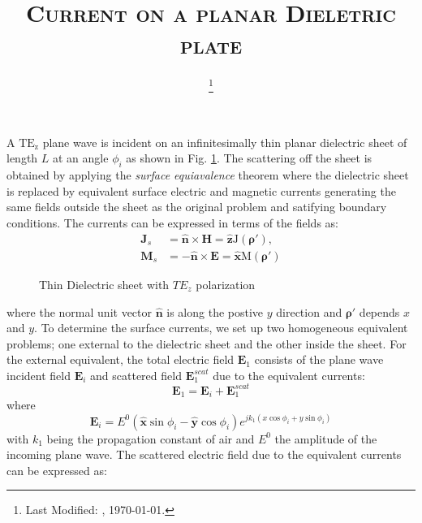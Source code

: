 \documentclass[11pt]{article}
\renewcommand{\v}[1]{\mathbf{#1}} %
\newcommand{\p}{\rho}  %
\newcommand{\x}{\times}  %
\renewcommand{\^}{\hat}  %
\begin{document}
\title{\textsc{Current on a planar Dieletric plate}\\}
\date{\footnote{Last Modified: \currenttime, \today.}}
\maketitle
%
A $\mathrm{TE_z}$ plane wave is incident on an infinitesimally thin planar dielectric sheet of length $L$ at an angle $\phi_i$ as shown in Fig. \ref{fig:plate}. The scattering off the sheet is obtained by applying the \emph{surface equiavalence} theorem where the dielectric sheet is replaced by equivalent surface electric and magnetic currents generating the same fields outside the sheet as the original problem and satifying boundary conditions. The currents can be expressed in terms of the fields as:
%
\begin{subequations}
  \begin{align}
    \v J_s &=  \v{\^{n}} \x \v{H} = \v{\^{z}} \mathrm{J(\v \p')},
    \label{eq:J_s}\\
    \v M_s &=  -\v{\^{n}} \x \v{E} = \v{\^{x}} \mathrm{M(\v \p')}
    \label{eq:M_s}
  \end{align}
  \label{eq:eq_currents}
\end{subequations}
%
\begin{figure}[h]
  \centering
  
  \caption{Thin Dielectric sheet with $TE_z$ polarization}
  \label{fig:plate}
\end{figure}
%
where the normal unit vector $\v{\^{n}}$ is along the postive $y$ direction and $\v \p'$ depends $x$ and $y$. To determine the surface currents, we set up two homogeneous equivalent problems; one external to the dielectric sheet and the other inside the sheet. For the external equivalent, the total electric field $\v E_1$ consists of the plane wave incident field $\v E_i$ and scattered field $\v E_1^{scat}$ due to the equivalent currents:
%
\begin{equation}
  \v E_1 = \v E_i + \v E_1^{scat}
  \label{eq:E1}
\end{equation}
%
where
%
\begin{equation}
  \v E_i = E^0 \left(\v{\^{x}} \sin \phi_i - \v{\^{y}} \cos \phi_i \right)   e^{j k_1 (x \cos \phi_i + y \sin \phi_i)}
  \label{eq:E_i}
\end{equation}
%
with $k_1$ being the propagation constant of air and $E^0$ the amplitude of the incoming plane wave. The scattered electric field due to the equivalent currents can be expressed as:
\end{document}
